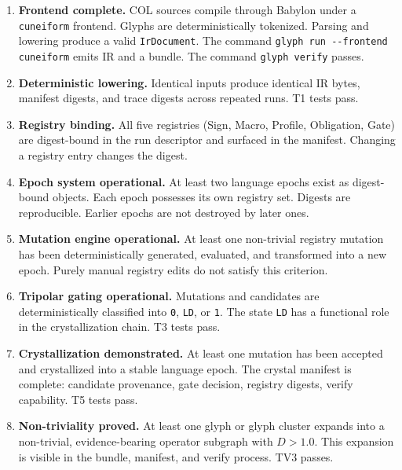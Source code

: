 \documentclass[11pt,a4paper,twoside]{article}
\theoremstyle{definition}
\theoremstyle{remark}
\begin{document}
\begin{enumerate}[label=\textbf{DoD-\arabic*},leftmargin=2.5cm]
  \item \textbf{Frontend complete.} COL sources compile through Babylon under a \texttt{cuneiform} frontend. Glyphs are deterministically tokenized. Parsing and lowering produce a valid \texttt{IrDocument}. The command \texttt{glyph run -{}-frontend cuneiform} emits IR and a bundle. The command \texttt{glyph verify} passes.

  \item \textbf{Deterministic lowering.} Identical inputs produce identical IR bytes, manifest digests, and trace digests across repeated runs. T1 tests pass.

  \item \textbf{Registry binding.} All five registries (Sign, Macro, Profile, Obligation, Gate) are digest-bound in the run descriptor and surfaced in the manifest. Changing a registry entry changes the digest.

  \item \textbf{Epoch system operational.} At least two language epochs exist as digest-bound objects. Each epoch possesses its own registry set. Digests are reproducible. Earlier epochs are not destroyed by later ones.

  \item \textbf{Mutation engine operational.} At least one non-trivial registry mutation has been deterministically generated, evaluated, and transformed into a new epoch. Purely manual registry edits do not satisfy this criterion.

  \item \textbf{Tripolar gating operational.} Mutations and candidates are deterministically classified into \texttt{0}, \texttt{LD}, or \texttt{1}. The state \texttt{LD} has a functional role in the crystallization chain. T3 tests pass.

  \item \textbf{Crystallization demonstrated.} At least one mutation has been accepted and crystallized into a stable language epoch. The crystal manifest is complete: candidate provenance, gate decision, registry digests, verify capability. T5 tests pass.

  \item \textbf{Non-triviality proved.} At least one glyph or glyph cluster expands into a non-trivial, evidence-bearing operator subgraph with $D > 1.0$. This expansion is visible in the bundle, manifest, and verify process. TV3 passes.


\end{enumerate}
\end{document}
